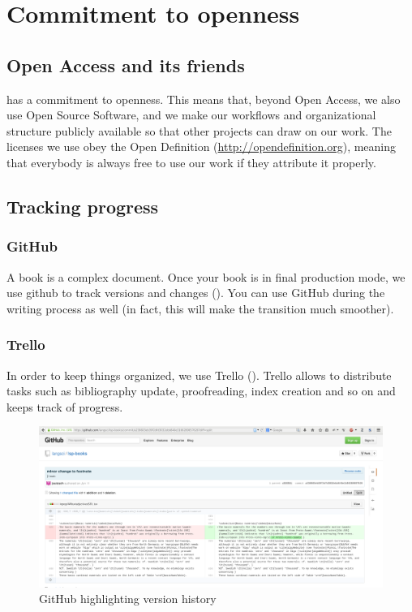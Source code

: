 \chapter{Commitment to openness}
\section{Open Access and its friends}
\lsp has a commitment to openness. This means that, beyond Open Access, we also use Open Source Software, and we make our workflows and organizational structure publicly available so that other projects can draw on our work. The licenses we use obey the Open Definition (\url{http://opendefinition.org}), meaning that everybody is always free to use our work if they attribute it properly.

\section{Tracking progress}
\subsection{GitHub}
A book is a complex document. Once your book is in final production mode, we use github to track versions and changes (). You can use GitHub during the writing process as well (in fact, this will make the transition much smoother).

\subsection{Trello}
In order to keep things organized, we use Trello (). Trello allows to distribute tasks such as bibliography update, proofreading, index creation and so on and keeps track of progress.

\begin{figure}
\caption{GitHub highlighting version history}
\label{fig:latex:github}
 \includegraphics[width=\textwidth]{github.png}
\end{figure}

